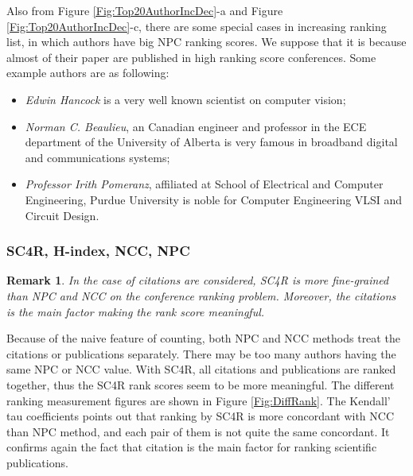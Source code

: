 \documentclass[10pt,leqno,twoside]{article}
\newtheorem{remark}{\indent Remark}[section]
\begin{document}
Also from Figure \ref{Fig:Top20AuthorIncDec}-a and Figure \ref{Fig:Top20AuthorIncDec}-c, there are some special cases in increasing ranking list, in which authors have big NPC ranking scores. We suppose that it is because almost of their paper are published in high ranking score conferences. Some example authors are as following: 
\begin{itemize}
\item \textit{Edwin Hancock} is a very well known scientist on computer vision;
\item \textit{Norman C. Beaulieu}, an Canadian engineer and professor in the ECE department of the University of Alberta is very famous in broadband digital and communications systems;
\item \textit{Professor Irith Pomeranz}, affiliated at School of Electrical and Computer Engineering, Purdue University %
is noble for Computer Engineering
VLSI and Circuit Design.
\end{itemize}
\subsubsection{SC4R, H-index, NCC, NPC}
\begin{remark}
In the case of citations are considered, SC4R is more fine-grained than NPC and NCC on the conference ranking problem. Moreover, the citations is the main factor making the rank score meaningful.
\end{remark}

Because of the naive feature of counting, both NPC and NCC methods treat the citations or publications separately. There may be too many authors having the same NPC or NCC value. With SC4R, all citations and publications are ranked together, thus the SC4R rank scores seem to be more meaningful. 
The different ranking measurement figures are shown in Figure \ref{Fig:DiffRank}.
The Kendall' tau coefficients points out that ranking by SC4R is more concordant with NCC than NPC method, and each pair of them is not quite the same concordant. It confirms again the fact that citation is the main factor for ranking scientific publications.
\end{document}
